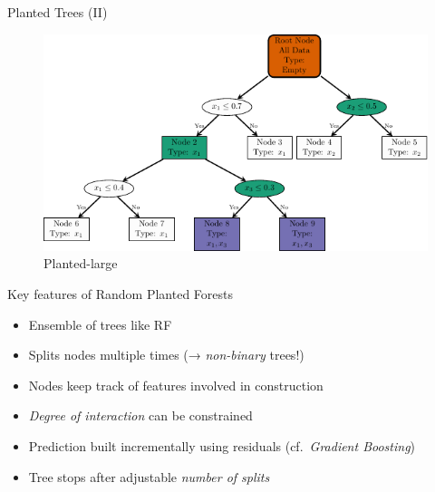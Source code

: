 \documentclass[aspectratio=169,12pt]{beamer}
\providecommand{\tightlist}{%
  \setlength{\itemsep}{2pt}\setlength{\parskip}{0pt}}
\begin{document}
\begin{frame}{Planted Trees (II)}
\label{planted-trees-ii}
\begin{figure}[H]

{\centering \includegraphics[width=\linewidth,height=0.75\textheight,keepaspectratio]{tree-planted-large.pdf}

}

\caption{Planted-large}

\end{figure}%
\end{frame}

\begin{frame}{Key features of Random Planted Forests}
\label{key-features-of-random-planted-forests}
\begin{itemize}[<+->]
\tightlist
\item
  Ensemble of trees like RF
\item
  Splits nodes multiple times (→ \emph{non-binary} trees!)
\item
  Nodes keep track of features involved in construction
\item
  \emph{Degree of interaction} can be constrained
\item
  Prediction built incrementally using residuals (cf.~\emph{Gradient
  Boosting})
\item
  Tree stops after adjustable \emph{number of splits}
\end{itemize}
\end{frame}
\end{document}
